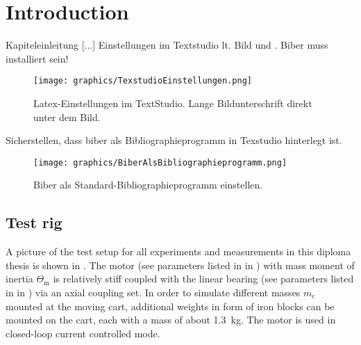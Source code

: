 \chapter{Introduction}
Kapiteleinleitung [...]
Einstellungen im Textstudio lt. Bild  und . Biber muss installiert sein!
\begin{figure}
\texttt{[image: graphics/TexstudioEinstellungen.png]}
\caption[Latex-Einstellungen im TextStudio - Bildunterschrift für Abbildungsverzeichnis.]{Latex-Einstellungen im TextStudio. Lange Bildunterschrift direkt unter dem Bild.}
\label{fig:Bildlabel}
\end{figure}

Sicherstellen, dass biber als Bibliographieprogramm in Texstudio hinterlegt ist.
\begin{figure}
	\texttt{[image: graphics/BiberAlsBibliographieprogramm.png]}
	\caption{Biber als Standard-Bibliographieprogramm einstellen.}
	\label{fig:Bildlabel2}
\end{figure}

\section{Test rig}
A picture of the test setup for all experiments and measurements in this diploma thesis is shown in . The motor (see parameters listed in  in ) with mass moment of inertia $\Theta_\text{m}$ is relatively stiff coupled with the linear bearing (see parameters listed in  in ) via an axial coupling set. In order to simulate different masses $m_\text{c}$ mounted at the moving cart, additional weights in form of iron blocks can be mounted on the cart, each with a mass of about \SI{1.3}{\kilogram}. The motor is used in closed-loop current controlled mode.

